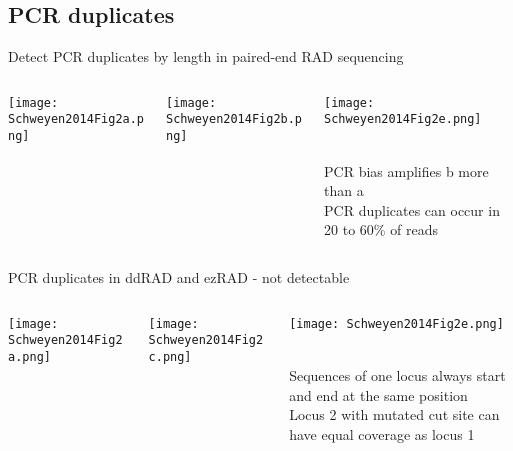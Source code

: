 \documentclass[presentation]{beamer}
\begin{document}
\subsection{PCR duplicates}
\label{sec-3-2}

\begin{frame}[label=sec-3-2-1]{Detect PCR duplicates by length in paired-end RAD sequencing}
\vspace{0.1cm}

\begin{columns}
\begin{column}{0.3\columnwidth}
\begin{raggedright}
\texttt{[image: Schweyen2014Fig2a.png]}
\end{raggedright}
\end{column}

\begin{column}{0.3\columnwidth}
\begin{raggedleft}
\texttt{[image: Schweyen2014Fig2b.png]}
\end{raggedleft}
\end{column}
\begin{column}{0.3\columnwidth}
\begin{raggedleft}
\texttt{[image: Schweyen2014Fig2e.png]}
\end{raggedleft}
\tiny{\citep{Schweyen2014}}\\
PCR bias amplifies b more than a\\
PCR duplicates can occur in 20 to 60\% of reads
\end{column}
\end{columns}
\end{frame}

\begin{frame}[label=sec-3-2-2]{PCR duplicates in ddRAD and ezRAD - not detectable}
\vspace{0.1cm}

\begin{columns}
\begin{column}{0.3\columnwidth}
\begin{raggedright}
\texttt{[image: Schweyen2014Fig2a.png]}
\end{raggedright}
\end{column}

\begin{column}{0.3\columnwidth}
\begin{raggedleft}
\texttt{[image: Schweyen2014Fig2c.png]}
\end{raggedleft}
\end{column}
\begin{column}{0.3\columnwidth}
\begin{raggedleft}
\texttt{[image: Schweyen2014Fig2e.png]}
\end{raggedleft}
\tiny{\citep{Schweyen2014}}\\
Sequences of one locus always start and end at the same position\\
Locus 2 with mutated cut site can have equal coverage as locus 1
\end{column}
\end{columns}
\end{frame}
\end{document}
